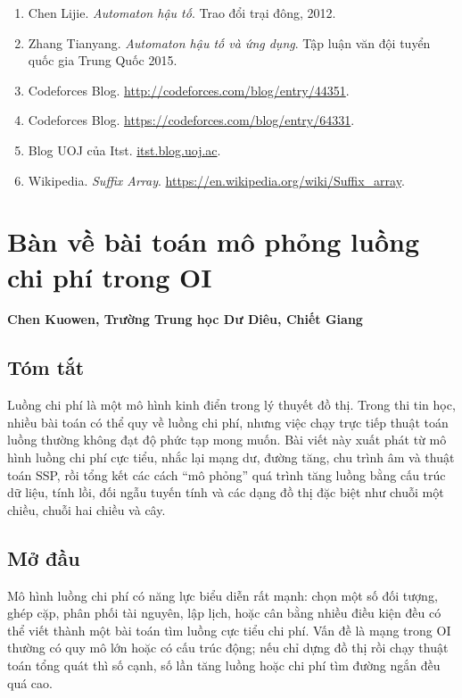 \documentclass[11pt]{article}
\begin{document}
\begin{enumerate}
  \item Chen Lijie. \emph{Automaton hậu tố}. Trao đổi trại đông, 2012.
  \item Zhang Tianyang. \emph{Automaton hậu tố và ứng dụng}. Tập luận văn đội
  tuyển quốc gia Trung Quốc 2015.
  \item Codeforces Blog. \url{http://codeforces.com/blog/entry/44351}.
  \item Codeforces Blog. \url{https://codeforces.com/blog/entry/64331}.
  \item Blog UOJ của Itst. \href{https://itst.blog.uoj.ac/blog/7514}{itst.blog.uoj.ac}.
  \item Wikipedia. \emph{Suffix Array}.
  \url{https://en.wikipedia.org/wiki/Suffix_array}.
\end{enumerate}

\section{Bàn về bài toán mô phỏng luồng chi phí trong OI}

\begin{center}
\textbf{Chen Kuowen, Trường Trung học Dư Diêu, Chiết Giang}
\end{center}

\subsection*{Tóm tắt}

Luồng chi phí là một mô hình kinh điển trong lý thuyết đồ thị. Trong thi tin
học, nhiều bài toán có thể quy về luồng chi phí, nhưng việc chạy trực tiếp thuật
toán luồng thường không đạt độ phức tạp mong muốn. Bài viết này xuất phát từ
mô hình luồng chi phí cực tiểu, nhắc lại mạng dư, đường tăng, chu trình âm và
thuật toán SSP, rồi tổng kết các cách ``mô phỏng'' quá trình tăng luồng bằng
cấu trúc dữ liệu, tính lồi, đối ngẫu tuyến tính và các dạng đồ thị đặc biệt
như chuỗi một chiều, chuỗi hai chiều và cây.

\subsection{Mở đầu}

Mô hình luồng chi phí có năng lực biểu diễn rất mạnh: chọn một số đối tượng,
ghép cặp, phân phối tài nguyên, lập lịch, hoặc cân bằng nhiều điều kiện đều có
thể viết thành một bài toán tìm luồng cực tiểu chi phí. Vấn đề là mạng trong
OI thường có quy mô lớn hoặc có cấu trúc động; nếu chỉ dựng đồ thị rồi chạy
thuật toán tổng quát thì số cạnh, số lần tăng luồng hoặc chi phí tìm đường ngắn
đều quá cao.
\end{document}
